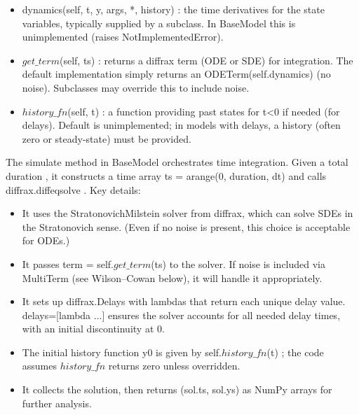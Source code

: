 \documentclass[11pt,a4paper]{article}
\begin{document}
\begin{itemize}

\item 
dynamics(self, t, y, args, *, history) : the time derivatives for the state variables,
typically supplied by a subclass. In BaseModel this is unimplemented (raises
NotImplementedError).

\item 
$get\_term$(self, ts) : returns a diffrax term (ODE or SDE) for integration. The default
implementation simply returns an ODETerm(self.dynamics) (no noise). Subclasses may override
this to include noise.

\item 
$history\_fn$(self, t) : a function providing past states for t<0 if needed (for delays). Default is
unimplemented; in models with delays, a history (often zero or steady-state) must be provided.\\
\end{itemize}

The simulate method in BaseModel orchestrates time integration. Given a total duration , it
constructs a time array ts = arange(0, duration, dt) and calls diffrax.diffeqsolve \cite{kidger2021neural}. Key
details:\\

\begin{itemize}

\item 
It uses the StratonovichMilstein solver from diffrax, which can solve SDEs in the Stratonovich
sense. (Even if no noise is present, this choice is acceptable for ODEs.)

\item 
It passes term = self.$get\_term$(ts) to the solver. If noise is included via MultiTerm (see
Wilson–Cowan below), it will handle it appropriately.

\item 
It sets up diffrax.Delays with lambdas that return each unique delay value. delays=[lambda ...]
ensures the solver accounts for all needed delay times, with an initial discontinuity at 0.

\item 
The initial history function y0 is given by self.$history\_fn$(t) ; the code assumes $history\_fn$
returns zero unless overridden.

\item 
It collects the solution, then returns (sol.ts, sol.ys)
as NumPy arrays for further analysis.
\end{itemize}
\end{document}
